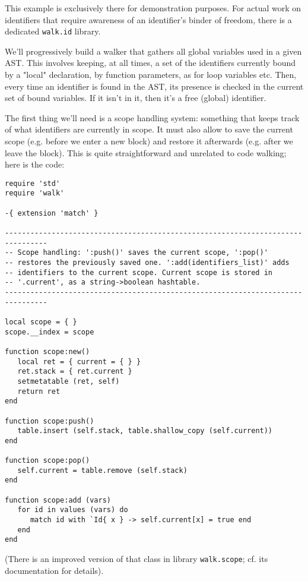 This example is exclusively there for demonstration purposes. For actual work on
identifiers that require awareness of an identifier's binder of freedom, there
is a dedicated {\tt walk.id} library.

We'll progressively build a walker that gathers all global variables used in a
given AST. This involves keeping, at all times, a set of the identifiers
currently bound by a "local" declaration, by function parameters, as for loop
variables etc. Then, every time an identifier is found in the AST, its presence
is checked in the current set of bound variables. If it isn't in it, then it's a
free (global) identifier.

The first thing we'll need is a scope handling system: something that keeps
track of what identifiers are currently in scope. It must also allow to save the
current scope (e.g. before we enter a new block) and restore it afterwards (e.g.
after we leave the block). This is quite straightforward and unrelated to code
walking; here is the code:

\begin{Verbatim}[fontsize=\scriptsize]
require 'std'
require 'walk'

-{ extension 'match' }

--------------------------------------------------------------------------------
-- Scope handling: ':push()' saves the current scope, ':pop()'
-- restores the previously saved one. ':add(identifiers_list)' adds
-- identifiers to the current scope. Current scope is stored in
-- '.current', as a string->boolean hashtable.
--------------------------------------------------------------------------------

local scope = { }
scope.__index = scope

function scope:new()
   local ret = { current = { } }
   ret.stack = { ret.current }
   setmetatable (ret, self)
   return ret
end

function scope:push()
   table.insert (self.stack, table.shallow_copy (self.current))
end

function scope:pop()
   self.current = table.remove (self.stack)
end

function scope:add (vars)
   for id in values (vars) do
      match id with `Id{ x } -> self.current[x] = true end
   end
end
\end{Verbatim}

(There is an improved version of that class in library {\tt walk.scope}; cf.
its documentation for details).

